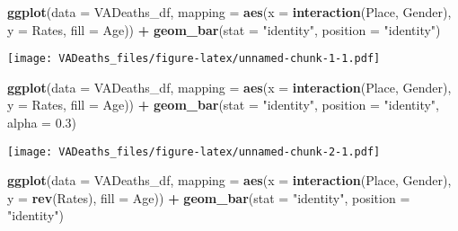 \documentclass[
]{article}
\newenvironment{Shaded}{\begin{snugshade}}{\end{snugshade}}
\newcommand{\DataTypeTok}[1]{\textcolor[rgb]{0.13,0.29,0.53}{#1}}
\newcommand{\FloatTok}[1]{\textcolor[rgb]{0.00,0.00,0.81}{#1}}
\newcommand{\KeywordTok}[1]{\textcolor[rgb]{0.13,0.29,0.53}{\textbf{#1}}}
\newcommand{\NormalTok}[1]{#1}
\newcommand{\OperatorTok}[1]{\textcolor[rgb]{0.81,0.36,0.00}{\textbf{#1}}}
\newcommand{\StringTok}[1]{\textcolor[rgb]{0.31,0.60,0.02}{#1}}
\begin{document}
\begin{Shaded}
\begin{Highlighting}[]
\KeywordTok{ggplot}\NormalTok{(}\DataTypeTok{data =}\NormalTok{ VADeaths_df,}
              \DataTypeTok{mapping =} \KeywordTok{aes}\NormalTok{(}\DataTypeTok{x =} \KeywordTok{interaction}\NormalTok{(Place, Gender), }
                            \DataTypeTok{y =}\NormalTok{ Rates, }
                            \DataTypeTok{fill =}\NormalTok{ Age)) }\OperatorTok{+}
\KeywordTok{geom_bar}\NormalTok{(}\DataTypeTok{stat =} \StringTok{"identity"}\NormalTok{, }
         \DataTypeTok{position =} \StringTok{"identity"}\NormalTok{)}
\end{Highlighting}
\end{Shaded}

\texttt{[image: VADeaths\_files/figure-latex/unnamed-chunk-1-1.pdf]}

\begin{Shaded}
\begin{Highlighting}[]
\KeywordTok{ggplot}\NormalTok{(}\DataTypeTok{data =}\NormalTok{ VADeaths_df,}
              \DataTypeTok{mapping =} \KeywordTok{aes}\NormalTok{(}\DataTypeTok{x =} \KeywordTok{interaction}\NormalTok{(Place, Gender), }
                            \DataTypeTok{y =}\NormalTok{ Rates, }
                            \DataTypeTok{fill =}\NormalTok{ Age)) }\OperatorTok{+}
\KeywordTok{geom_bar}\NormalTok{(}\DataTypeTok{stat =} \StringTok{"identity"}\NormalTok{, }
         \DataTypeTok{position =} \StringTok{"identity"}\NormalTok{,}
         \DataTypeTok{alpha =} \FloatTok{0.3}\NormalTok{)}
\end{Highlighting}
\end{Shaded}

\texttt{[image: VADeaths\_files/figure-latex/unnamed-chunk-2-1.pdf]}

\begin{Shaded}
\begin{Highlighting}[]
\KeywordTok{ggplot}\NormalTok{(}\DataTypeTok{data =}\NormalTok{ VADeaths_df,}
              \DataTypeTok{mapping =} \KeywordTok{aes}\NormalTok{(}\DataTypeTok{x =} \KeywordTok{interaction}\NormalTok{(Place, Gender), }
                            \DataTypeTok{y =} \KeywordTok{rev}\NormalTok{(Rates), }
                            \DataTypeTok{fill =}\NormalTok{ Age)) }\OperatorTok{+}
\KeywordTok{geom_bar}\NormalTok{(}\DataTypeTok{stat =} \StringTok{"identity"}\NormalTok{, }
         \DataTypeTok{position =} \StringTok{"identity"}\NormalTok{)}
\end{Highlighting}
\end{Shaded}
\end{document}
